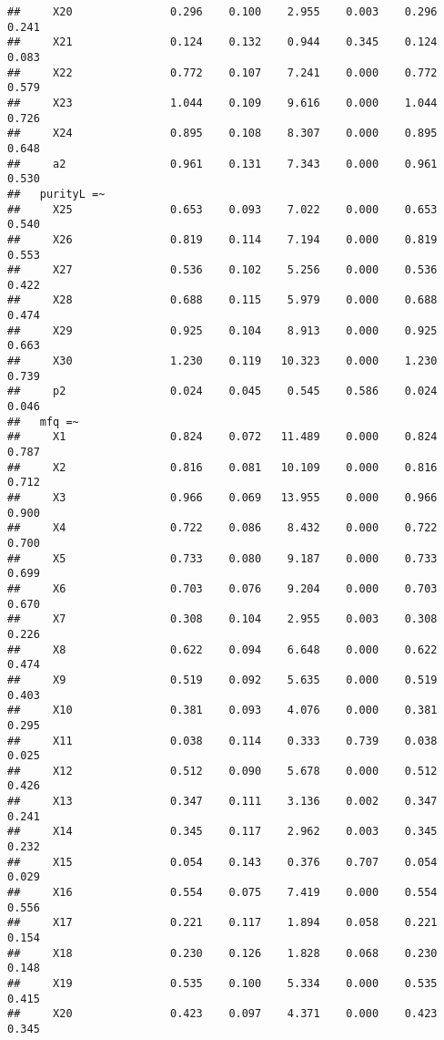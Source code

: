\documentclass[english,man]{apa6}
\theoremstyle{definition}
\theoremstyle{definition}
\theoremstyle{definition}
\theoremstyle{remark}
\begin{document}
\begin{verbatim}
##     X20               0.296    0.100    2.955    0.003    0.296    0.241
##     X21               0.124    0.132    0.944    0.345    0.124    0.083
##     X22               0.772    0.107    7.241    0.000    0.772    0.579
##     X23               1.044    0.109    9.616    0.000    1.044    0.726
##     X24               0.895    0.108    8.307    0.000    0.895    0.648
##     a2                0.961    0.131    7.343    0.000    0.961    0.530
##   purityL =~                                                            
##     X25               0.653    0.093    7.022    0.000    0.653    0.540
##     X26               0.819    0.114    7.194    0.000    0.819    0.553
##     X27               0.536    0.102    5.256    0.000    0.536    0.422
##     X28               0.688    0.115    5.979    0.000    0.688    0.474
##     X29               0.925    0.104    8.913    0.000    0.925    0.663
##     X30               1.230    0.119   10.323    0.000    1.230    0.739
##     p2                0.024    0.045    0.545    0.586    0.024    0.046
##   mfq =~                                                                
##     X1                0.824    0.072   11.489    0.000    0.824    0.787
##     X2                0.816    0.081   10.109    0.000    0.816    0.712
##     X3                0.966    0.069   13.955    0.000    0.966    0.900
##     X4                0.722    0.086    8.432    0.000    0.722    0.700
##     X5                0.733    0.080    9.187    0.000    0.733    0.699
##     X6                0.703    0.076    9.204    0.000    0.703    0.670
##     X7                0.308    0.104    2.955    0.003    0.308    0.226
##     X8                0.622    0.094    6.648    0.000    0.622    0.474
##     X9                0.519    0.092    5.635    0.000    0.519    0.403
##     X10               0.381    0.093    4.076    0.000    0.381    0.295
##     X11               0.038    0.114    0.333    0.739    0.038    0.025
##     X12               0.512    0.090    5.678    0.000    0.512    0.426
##     X13               0.347    0.111    3.136    0.002    0.347    0.241
##     X14               0.345    0.117    2.962    0.003    0.345    0.232
##     X15               0.054    0.143    0.376    0.707    0.054    0.029
##     X16               0.554    0.075    7.419    0.000    0.554    0.556
##     X17               0.221    0.117    1.894    0.058    0.221    0.154
##     X18               0.230    0.126    1.828    0.068    0.230    0.148
##     X19               0.535    0.100    5.334    0.000    0.535    0.415
##     X20               0.423    0.097    4.371    0.000    0.423    0.345

\end{verbatim}
\end{document}
